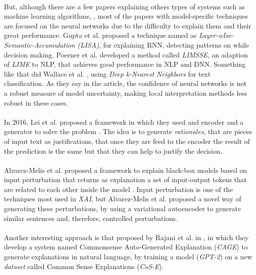\paragraph{}
But, although there are a few papers explaining others types of systems such as machine learning algorithms, \cite{Pappas2014}, most of the papers with model-specific techniques are focused on the neural networks due to the difficulty to explain them and their great performance. Gupta et al. proposed a technique named as \emph{Layer-wIse-Semantic-Accumulation (LISA)}, \cite{Gupta2018} for explaining RNN, detecting patterns on while decision making. Poerner et al. developed a method called \emph{LIMSSE}, an adaption of \emph{LIME} to NLP, that achieves good performance in NLP and DNN. Something like that did Wallace et al. \cite{Wallace2018}, using \emph{Deep k-Nearest Neighbors}\cite{Papernot2018} for text classification. As they say in the article, the confidence of neural networks is not a robust measure of model uncertainty, making local interpretation methods less robust in these cases.
\paragraph{}
In 2016, Lei et al. proposed a framework in which they used and encoder and a generator to solve the problem \cite{Lei2016}. The idea is to generate \emph{rationales}, that are pieces of input text as justifications, that once they are feed to the encoder the result of the prediction is the same but that they can help to justify the decision. 
\paragraph{}
Alvarez-Melis et al. proposed a framework to explain black-box models based on input perturbation that returns as explanation a set of input-output tokens that are related to each other inside the model \cite{Alvarez2017}. Input perturbation is one of the techniques most used in \emph{XAI}, but Alvarez-Melis et al. proposed a novel way of generating these perturbations, by using a variational autoencoder to generate similar sentences and, therefore, controlled perturbations. 
\paragraph{}
Another interesting approach is that proposed by Rajani et al. in \cite{Rajani2019}, in which they develop a system named Commonsense Auto-Generated Explanation (\emph{CAGE}) to generate explanations in natural language, by training a model (\emph{GPT-2}) on a new \emph{dataset} called Common Sense Explanations (\emph{CoS-E}).

